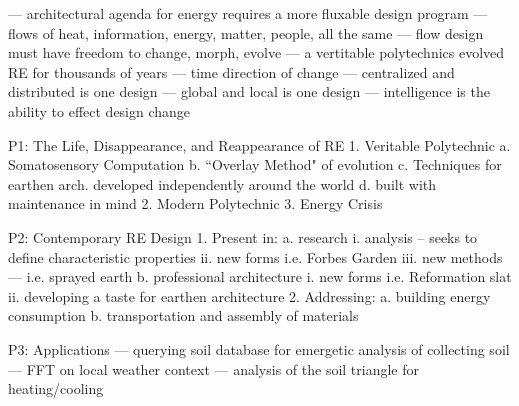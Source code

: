 --- architectural agenda for energy requires a more fluxable design program
--- flows of heat, information, energy, matter, people, all the same
--- flow design must have freedom to change, morph, evolve
--- a vertitable polytechnics evolved RE for thousands of years
--- time direction of change
--- centralized and distributed is one design
--- global and local is one design
--- intelligence is the ability to effect design change

P1: The Life, Disappearance, and Reappearance of RE
  1. Veritable Polytechnic
    a. Somatosensory Computation
    b. ``Overlay Method" of evolution
    c. Techniques for earthen arch. developed independently around the world
    d. built with maintenance in mind
  2. Modern Polytechnic
  3. Energy Crisis



P2: Contemporary RE Design
  1. Present in:
    a. research
      i. analysis -- seeks to define characteristic properties
      ii. new forms i.e. Forbes Garden
      iii. new methods --- i.e. sprayed earth
    b. professional architecture
      i. new forms i.e. Reformation slat
      ii. developing a taste for earthen architecture
  2. Addressing:
    a. building energy consumption
    b. transportation and assembly of materials



P3: Applications
--- querying soil database for emergetic analysis of collecting soil
--- FFT on local weather context
--- analysis of the soil triangle for heating/cooling
